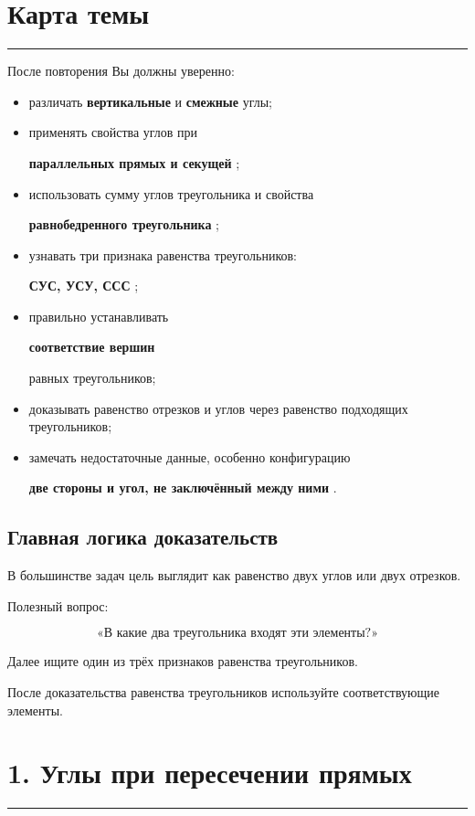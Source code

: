 \documentclass[a4paper,12pt]{article}
\newcommand{\sectionline}{
  \par
  \vspace{0.2em}
  \textcolor{lightline}{\rule{\linewidth}{0.8pt}}
  \par
  \vspace{0.35em}
}
\newcommand{\key}[1]{
  \textcolor{darkaccent}{\textbf{#1}}
}
\begin{document}
\section*{Карта темы}
\sectionline

После повторения Вы должны уверенно:

\begin{itemize}

\item
различать \key{вертикальные} и \key{смежные} углы;

\item
применять свойства углов при
\key{параллельных прямых и секущей};

\item
использовать сумму углов треугольника и свойства
\key{равнобедренного треугольника};

\item
узнавать три признака равенства треугольников:
\key{СУС, УСУ, ССС};

\item
правильно устанавливать
\key{соответствие вершин}
равных треугольников;

\item
доказывать равенство отрезков и углов
через равенство подходящих треугольников;

\item
замечать недостаточные данные,
особенно конфигурацию
\key{две стороны и угол, не заключённый между ними}.

\end{itemize}

\subsection*{Главная логика доказательств}

В большинстве задач цель выглядит как равенство двух углов
или двух отрезков.

Полезный вопрос:

\[
\text{«В какие два треугольника входят эти элементы?»}
\]

Далее ищите один из трёх признаков равенства треугольников.

После доказательства равенства треугольников
используйте соответствующие элементы.


\section*{1. Углы при пересечении прямых}
\sectionline
\end{document}
